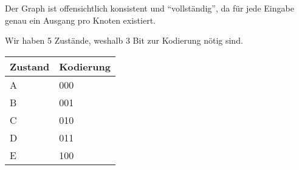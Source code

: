 \documentclass{CInf_practice}
\begin{document}
Der Graph ist offensichtlich konsistent und ``vollständig'', da für jede Eingabe
genau ein Ausgang pro Knoten existiert.

\subex{}

Wir haben 5 Zustände, weshalb 3 Bit zur Kodierung nötig sind.

\begin{center}
   \begin{tabular}{ll}
      \hline
      Zustand & Kodierung \\\hline
      A & 000 \\
      B & 001 \\
      C & 010 \\
      D & 011 \\
      E & 100 \\
      \hline
   \end{tabular}
\end{center}
\end{document}
